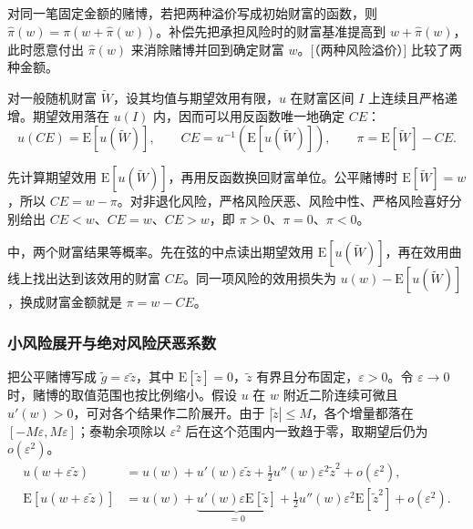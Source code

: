 对同一笔固定金额的赌博，若把两种溢价写成初始财富的函数，则 $\hat\pi(w)=\pi(w+\hat\pi(w))$。补偿先把承担风险时的财富基准提高到 $w+\hat\pi(w)$，此时愿意付出 $\hat\pi(w)$ 来消除赌博并回到确定财富 $w$。[（两种风险溢价）] 比较了两种金额。

\hypertarget{wj-certainty-equivalent-risk-premium}{}
\begin{tcolorbox}[knowledge,title=确定性等值与风险溢价]
对一般随机财富 $\widetilde W$，设其均值与期望效用有限，$u$ 在财富区间 $I$ 上连续且严格递增。期望效用落在 $u(I)$ 内，因而可以用反函数唯一地确定 $CE$：
\[
 u(CE)=\mathrm E[u(\widetilde W)],\qquad
 CE=u^{-1}(\mathrm E[u(\widetilde W)]),\qquad
 \pi=\mathrm E[\widetilde W]-CE.
\]

先计算期望效用 $\mathrm E[u(\widetilde W)]$，再用反函数换回财富单位。公平赌博时 $\mathrm E[\widetilde W]=w$，所以 $CE=w-\pi$。对非退化风险，严格风险厌恶、风险中性、严格风险喜好分别给出 $CE<w$、$CE=w$、$CE>w$，即 $\pi>0$、$\pi=0$、$\pi<0$。
\end{tcolorbox}

 中，两个财富结果等概率。先在弦的中点读出期望效用 $\mathrm E[u(\widetilde W)]$，再在效用曲线上找出达到该效用的财富 $CE$。同一项风险的效用损失为 $u(w)-\mathrm E[u(\widetilde W)]$，换成财富金额就是 $\pi=w-CE$。

\begin{center}
\begin{minipage}{\linewidth}
%
\centering
{}
\end{minipage}
\end{center}

\subsubsection{小风险展开与绝对风险厌恶系数}\label{sec:wj-seven-small-risk}
把公平赌博写成 $\tilde g=\varepsilon\tilde z$，其中 $\mathrm E[\tilde z]=0$，$\tilde z$ 有界且分布固定，$\varepsilon>0$。令 $\varepsilon\to0$ 时，赌博的取值范围也按比例缩小。假设 $u$ 在 $w$ 附近二阶连续可微且 $u'(w)>0$，可对各个结果作二阶展开。由于 $|\tilde z|\le M$，各个增量都落在 $[-M\varepsilon,M\varepsilon]$；泰勒余项除以 $\varepsilon^2$ 后在这个范围内一致趋于零，取期望后仍为 $o(\varepsilon^2)$。
\[
\begin{aligned}
 u(w+\varepsilon\tilde z)
 &=u(w)+u'(w)\varepsilon\tilde z
   +\tfrac12u''(w)\varepsilon^2\tilde z^2+o(\varepsilon^2),\\
 \mathrm E[u(w+\varepsilon\tilde z)]
 &=u(w)+\underbrace{u'(w)\varepsilon\mathrm E[\tilde z]}_{=0}
   +\tfrac12u''(w)\varepsilon^2\mathrm E[\tilde z^2]+o(\varepsilon^2).
\end{aligned}
\]

